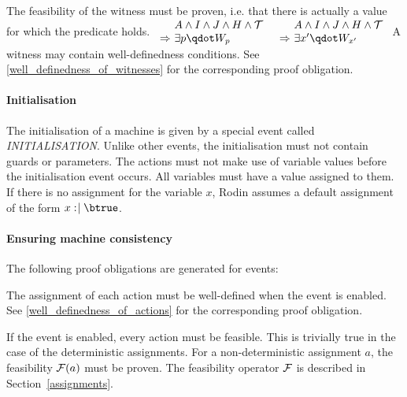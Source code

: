 The feasibility of the witness must be proven, i.e. that there is actually a value for which the predicate holds.
%
  {$\begin{array}{r@{\ }l}
      & A \land I \land J \land H \land \concbeforeafter \\
      \limp & \exists p \qdot W_p
    \end{array}$}
%
  {$\begin{array}{r@{\ }l}
      & A \land I \land J \land H \land \concbeforeafter \\
      \limp & \exists x' \qdot W_{x'}
    \end{array}$}
A witness may contain well-definedness conditions. See \ref{well_definedness_of_witnesses}
  for the corresponding proof obligation.

\paragraph{Initialisation}
\label{initialization}
The initialisation of a machine is given by a special event called \textsl{INITIALISATION}.
Unlike other events, the initialisation must not contain guards or parameters.
The actions must not make use of variable values before the initialisation event occurs.
All variables must have a value assigned to them. If there is no assignment for the variable $x$, Rodin assumes a default assignment of the form $x\bcmsuch \btrue$.

\paragraph{Ensuring machine consistency}
\label{consistency_proof_obligations}
The following proof obligations are generated for events:

The assignment of each action must be well-defined when the event is enabled. See
  \ref{well_definedness_of_actions} for the corresponding proof obligation.
  
If the event is enabled, every action must be feasible.
  This is trivially true in the case of the deterministic assignments.
  For a non-deterministic assignment $a$, the feasibility $\mathcal{F}(a)$ must be proven.
  The feasibility operator $\mathcal{F}$ is described in Section~\ref{assignments}.
  
